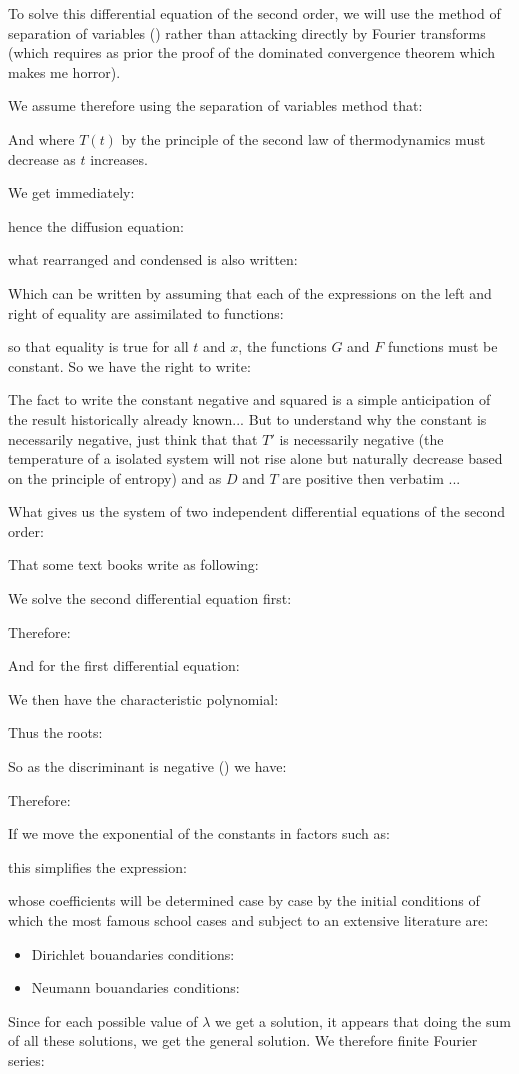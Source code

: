 	To solve this differential equation of the second order, we will use the method of separation of variables () rather than attacking directly by Fourier transforms (which requires as prior the proof of the dominated convergence theorem which makes me horror).

	We assume therefore using the separation of variables method that:
	
	And where $T(t)$ by the principle of the second law of thermodynamics must decrease as $t$ increases.

	We get immediately:
	
	hence the diffusion equation:
	
	what rearranged and condensed is also written:
	
	Which can be written by assuming that each of the expressions on the left and right of equality are assimilated to functions:
	
	so that equality is true for all $t$ and $x$, the functions $G$ and $F$ functions must be constant. So we have the right to write:
	
	The fact to write the constant negative and squared is a simple anticipation of the result historically already known... But to understand why the constant is necessarily negative, just think that that $T'$ is necessarily negative (the temperature of a isolated system will not rise alone but naturally decrease based on the principle of entropy) and as $D$ and $T$ are positive then verbatim ...

	What gives us the system of two independent differential equations of the second order:
	
	That some text books write as following:
	
	We solve the second differential equation first:
	
	Therefore:
	
	And for the first differential equation:
	
	We then have the characteristic polynomial:
	
	Thus the roots:
	
	So as the discriminant is negative () we have:
	
	Therefore:
	
	If we move the exponential of the constants in factors such as:
	
	this simplifies the expression:
	
	whose coefficients will be determined case by case by the initial conditions of which the most famous school cases and subject to an extensive literature are:
	\begin{itemize}
		\item Dirichlet bouandaries conditions:
		

		\item Neumann bouandaries conditions:
		
	\end{itemize}
	Since for each possible value of $\lambda$ we get a solution, it appears that doing the sum of all these solutions, we get the general solution. We therefore finite Fourier series:
	
